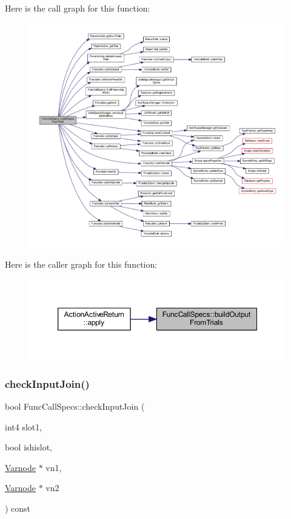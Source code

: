 Here is the call graph for this function\+:
\nopagebreak
\begin{figure}[H]
\begin{center}
\leavevmode
\includegraphics[width=350pt]{class_func_call_specs_a15f172165e29fbabfbb02be245ee1c98_cgraph}
\end{center}
\end{figure}
Here is the caller graph for this function\+:
\nopagebreak
\begin{figure}[H]
\begin{center}
\leavevmode
\includegraphics[width=350pt]{class_func_call_specs_a15f172165e29fbabfbb02be245ee1c98_icgraph}
\end{center}
\end{figure}
\mbox{\label{class_func_call_specs_a808f3d0c962701b6c98bca1792e86908}} 
\subsubsection{\texorpdfstring{checkInputJoin()}{checkInputJoin()}}
{\footnotesize\ttfamily bool Func\+Call\+Specs\+::check\+Input\+Join (\begin{DoxyParamCaption}\item[{int4}]{slot1,  }\item[{bool}]{ishislot,  }\item[{\mbox{\hyperlink{class_varnode}{Varnode}} $\ast$}]{vn1,  }\item[{\mbox{\hyperlink{class_varnode}{Varnode}} $\ast$}]{vn2 }\end{DoxyParamCaption}) const}



